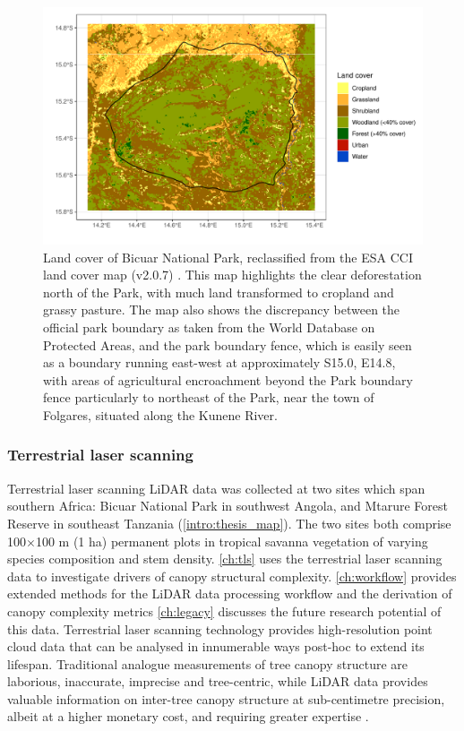 \begin{refsection}
\begin{figure}
	\includegraphics[width=\linewidth]{img/bicuar_land_cover}
	\caption[Bicuar National Park land cover]{Land cover of Bicuar National Park, reclassified from the ESA CCI land cover map (v2.0.7) \citep{ESACCI}. This map highlights the clear deforestation north of the Park, with much land transformed to cropland and grassy pasture. The map also shows the discrepancy between the official park boundary as taken from the World Database on Protected Areas, and the park boundary fence, which is easily seen as a boundary running east-west at approximately S15.0\textdegree{}, E14.8\textdegree{}, with areas of agricultural encroachment beyond the Park boundary fence particularly to northeast of the Park, near the town of Folgares, situated along the Kunene River.}
	\label{intro:bicuar_land_cover}
\end{figure}


\subsubsection{Terrestrial laser scanning}
\label{intro:sssec:tls}

Terrestrial laser scanning LiDAR data was collected at two sites which span southern Africa: Bicuar National Park in southwest Angola, and Mtarure Forest Reserve in southeast Tanzania (\autoref{intro:thesis_map}). The two sites both comprise 100$\times$100 m (1 ha) permanent plots in tropical savanna vegetation of varying species composition and stem density. \autoref{ch:tls} uses the terrestrial laser scanning data to investigate drivers of canopy structural complexity. \autoref{ch:workflow} provides extended methods for the LiDAR data processing workflow and the derivation of canopy complexity metrics \autoref{ch:legacy} discusses the future research potential of this data. Terrestrial laser scanning technology provides high-resolution point cloud data that can be analysed in innumerable ways post-hoc to extend its lifespan. Traditional analogue measurements of tree canopy structure are laborious, inaccurate, imprecise and tree-centric, while LiDAR data provides valuable information on inter-tree canopy structure at sub-centimetre precision, albeit at a higher monetary cost, and requiring greater expertise \citep{Xiao2019, Dassot2011}.

\newpage{}
\FloatBarrier{}
\begingroup
{}
\printbibliography[heading=subbibintoc]
\endgroup

\end{refsection}


